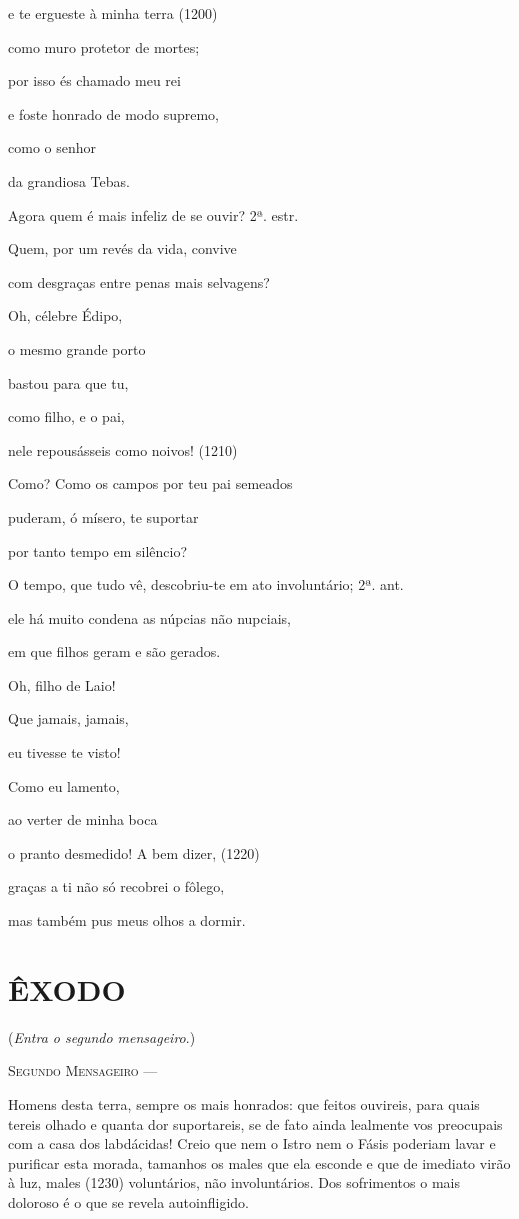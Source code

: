 e te ergueste à minha terra (1200)

como muro protetor de mortes;

por isso és chamado meu rei

e foste honrado de modo supremo,

como o senhor

da grandiosa Tebas.

Agora quem é mais infeliz de se ouvir? 2ª. estr.

Quem, por um revés da vida, convive

com desgraças entre penas mais selvagens?

Oh, célebre Édipo,

o mesmo grande porto

bastou para que tu,

como filho, e o pai,

nele repousásseis como noivos! (1210)

Como? Como os campos por teu pai semeados

puderam, ó mísero, te suportar

por tanto tempo em silêncio?

O tempo, que tudo vê, descobriu-te em ato involuntário; 2ª. ant.

ele há muito condena as núpcias não nupciais,

em que filhos geram e são gerados.

Oh, filho de Laio!

Que jamais, jamais,

eu tivesse te visto!

Como eu lamento,

ao verter de minha boca

o pranto desmedido! A bem dizer, (1220)

graças a ti não só recobrei o fôlego,

mas também pus meus olhos a dormir.

\section{ÊXODO}

(\emph{Entra o segundo mensageiro}.)

\textsc{Segundo Mensageiro} ---

Homens desta terra, sempre os mais honrados: que feitos ouvireis, para
quais tereis olhado e quanta dor suportareis, se de fato ainda lealmente
vos preocupais com a casa dos labdácidas! Creio que nem o Istro nem o
Fásis poderiam lavar e purificar esta morada, tamanhos os males que ela
esconde e que de imediato virão à luz, males (1230) voluntários, não
involuntários. Dos sofrimentos o mais doloroso é o que se revela
autoinfligido.

